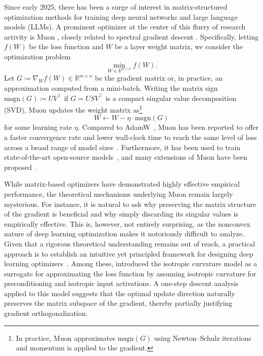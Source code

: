 \documentclass[11pt]{article}
\begin{document}
 
Since early 2025, there has been a surge of interest in matrix-structured optimization methods for training deep neural networks and large language models (LLMs). A prominent optimizer at the center of this flurry of research activity is Muon \citep{jordan2024muon}, closely related to spectral gradient descent \citep{carlson2015preconditioned}. Specifically, letting \(f({W})\) be the loss function and \({W}\) be a layer weight matrix, we consider the optimization problem
\[
\min_{W \in \mathbb{R}^{m \times n}} f(W).
\]
Let \({G} \coloneqq \nabla_{{W}} f({W})\in\mathbb{R}^{m\times n}\) be the gradient matrix or, in practice, an approximation computed from a mini-batch. Writing the matrix sign $\mathrm{msgn}({G}) \coloneqq {U}{V}^\top$ if ${G}={U}{S}{V}^\top$ is a compact singular value decomposition (SVD), Muon updates the weight matrix as\footnote{In practice, Muon approximates \(\mathrm{msgn}({G})\) using Newton--Schulz iterations and momentum is applied to the gradient.}
\[
W \leftarrow W - \eta \cdot \mathrm{msgn}({G})
\]
for some learning rate $\eta$. Compared to AdamW~\citep{kingma2014adam,loshchilov2017decoupled}, Muon has been reported to offer a faster convergence rate and lower wall-clock time to reach the same level of loss across a broad range of model sizes~\citep{liu2025muon,essentialai2025practical,wen2025fantastic}. Furthermore, it has been used to train state-of-the-art open-source models~\citep{kimiteam2026kimik25visualagentic,zeng2026glm}, and many extensions of Muon have been proposed~\citep{li2025normuon,pethick2025training,ahn2025dion2,he2025low,xu2026fismo,qi2026delving,gu2026mano}.
 
While matrix-based optimizers have demonstrated highly effective empirical performance, the theoretical mechanisms underlying Muon remain largely mysterious. For instance, it is natural to ask why preserving the matrix structure of the gradient is beneficial and why simply discarding its singular values is empirically effective. This is, however, not entirely surprising, as the nonconvex nature of deep learning optimization makes it notoriously difficult to analyze. Given that a rigorous theoretical understanding remains out of reach, a practical approach is to establish an intuitive yet principled framework for designing deep learning optimizers~\citep{bernstein2024old,pethick2025training,lau2025polargrad,gong2026aro}. Among these, \citet{su2025isotropic} introduced the isotropic curvature model as a surrogate for approximating the loss function by assuming isotropic curvature for preconditioning and isotropic input activations. A one-step descent analysis applied to this model suggests that the optimal update direction naturally preserves the matrix subspace of the gradient, thereby partially justifying gradient orthogonalization. 
 
\end{document}
